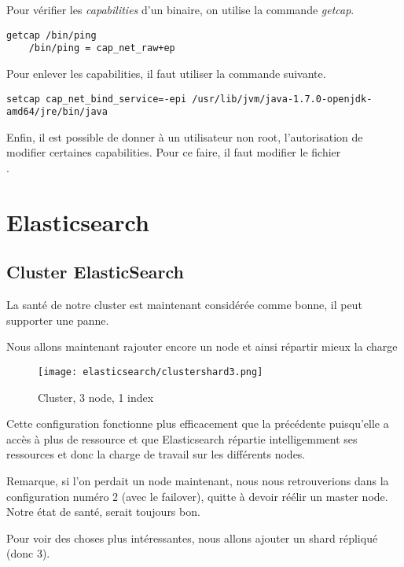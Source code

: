 Pour vérifier les \textit{capabilities} d'un binaire, on utilise la commande 
\emph{getcap}.

\begin{lstlisting}[style=code,label={lst:getcapabilities}]
    getcap /bin/ping
    /bin/ping = cap_net_raw+ep
\end{lstlisting}

Pour enlever les capabilities, il faut utiliser la commande suivante.
\begin{lstlisting}[style=code,label={lst:unsetcapabilities}]
setcap cap_net_bind_service=-epi /usr/lib/jvm/java-1.7.0-openjdk-amd64/jre/bin/java
\end{lstlisting}

Enfin, il est possible de donner à un utilisateur non root, l'autorisation
de modifier certaines capabilities. Pour ce faire, il faut modifier le fichier \\[1mm]
.

\section{Elasticsearch}
\subsection{Cluster ElasticSearch}
\label{subsec:elasticcluster}

La santé de notre cluster est maintenant considérée comme bonne, il peut supporter 
une panne.

Nous allons maintenant rajouter encore un node et ainsi répartir mieux la charge

\begin{figure}[H]
\center
\texttt{[image: elasticsearch/clustershard3.png]}
\label{fig:clustershard3}
\caption{Cluster, 3 node, 1 index}
\end{figure}

Cette configuration fonctionne plus efficacement que la précédente puisqu'elle a 
accès à plus de ressource et que Elasticsearch répartie intelligemment ses ressources
et donc la charge de travail sur les différents nodes.

Remarque, si l'on perdait un node maintenant, nous nous retrouverions dans la configuration
numéro 2 (avec le failover), quitte à devoir réélir un master node. Notre état de santé,
serait toujours bon.

Pour voir des choses plus intéressantes, nous allons ajouter un shard répliqué (donc 3).

